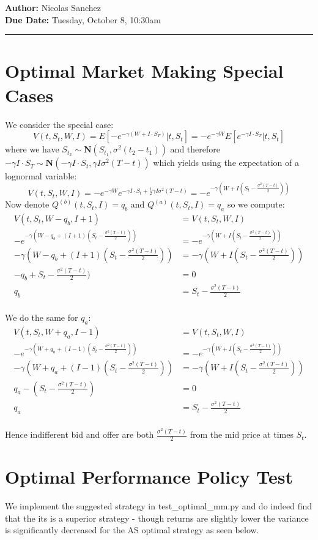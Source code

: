 \documentclass{article}[12pt]
\newcommand{\headings}[4]{\noindent {\bf Assignment 10 CME241} \hfill {{\bf Author:} Nicolas Sanchez} \\
{} \hfill {{\bf Due Date:} #2} \\

\rule[0.1in]{\textwidth}{0.025in}
}
\begin{document}
\headings{\#1}{Tuesday, October 8, 10:30am}\section{} 



\section{Optimal Market Making Special Cases}
We consider the special case:
$$ V(t,S_t, W, I) = E[-e^{-\gamma(W+I\cdot S_T)}| t,S_t] = -e^{-\gamma W} E[e^{-\gamma I \cdot S_T} | t, S_t]$$
where we have $S_{t_2} \sim \mathbf{N}(S_{t_1}, \sigma^2(t_2 - t_1))$ and therefore $-\gamma I \cdot S_T \sim \mathbf{N}(-\gamma I \cdot S_t, \gamma I \sigma^2(T-t))$ which yields using the expectation of a lognormal variable:
$$ V(t,S_t, W, I) =  -e^{-\gamma W} e^{-\gamma I \cdot S_t + \frac{1}{2}\gamma I \sigma^2(T-t)} = -e^{-\gamma(W+I(S_t-\frac{\sigma^2(T-t)}{2}))}$$
Now denote $Q^{(b)}(t,S_t, I) = q_b$ and $Q^{(a)}(t,S_t, I) = q_a$ so we compute:
\begin{align*}
V(t, S_t, W - q_b, I+1) &= V(t, S_t, W, I)\\
-e^{-\gamma(W-q_b+(I+1)(S_t-\frac{\sigma^2(T-t)}{2}))} &= -e^{-\gamma(W+I(S_t-\frac{\sigma^2(T-t)}{2}))}\\
-\gamma(W-q_b+(I+1)(S_t-\frac{\sigma^2(T-t)}{2})) &= -\gamma(W+I(S_t-\frac{\sigma^2(T-t)}{2}))\\
-q_b+S_t-\frac{\sigma^2(T-t)}{2}) &=0\\
q_b &= S_t-\frac{\sigma^2(T-t)}{2}\\
\end{align*}

We do the same for $q_a$:
\begin{align*}
V(t, S_t, W + q_a, I-1) &= V(t, S_t, W, I)\\
-e^{-\gamma(W+q_a+(I-1)(S_t-\frac{\sigma^2(T-t)}{2}))} &= -e^{-\gamma(W+I(S_t-\frac{\sigma^2(T-t)}{2}))}\\
-\gamma(W+q_a+(I-1)(S_t-\frac{\sigma^2(T-t)}{2})) &= -\gamma(W+I(S_t-\frac{\sigma^2(T-t)}{2}))\\
q_a-(S_t-\frac{\sigma^2(T-t)}{2}) &=0\\
q_a&= S_t-\frac{\sigma^2(T-t)}{2}\\
\end{align*}

Hence indifferent bid and offer are both $\frac{\sigma^2(T-t)}{2}$ from the mid price at times $S_t$.
\section{Optimal Performance Policy Test}
We implement the suggested strategy in test\_optimal\_mm.py and do indeed find that the its is a superior strategy - though returns are slightly lower the variance is significantly decreased for the AS optimal strategy as seen below.
\end{document}
